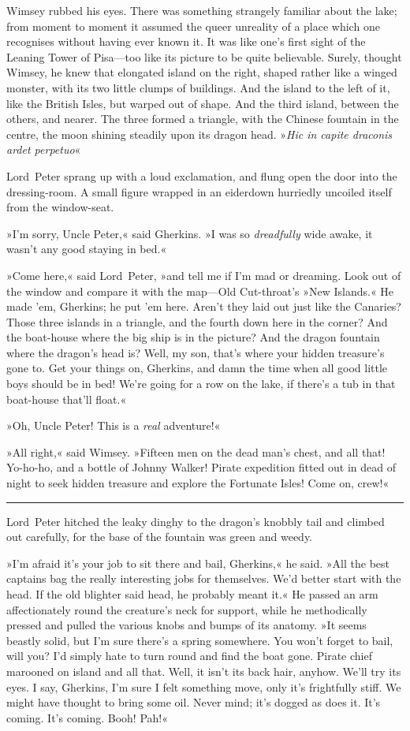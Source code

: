 Wimsey rubbed his eyes. There was something strangely familiar about the lake; from moment to moment it assumed the queer unreality of a place which one recognises without having ever known it. It was like one's first sight of the Leaning Tower of Pisa—too like its picture to be quite believable. Surely, thought Wimsey, he knew that elongated island on the right, shaped rather like a winged monster, with its two little clumps of buildings. And the island to the left of it, like the British Isles, but warped out of shape. And the third island, between the others, and nearer. The three formed a triangle, with the Chinese fountain in the centre, the moon shining steadily upon its dragon head. »\textit{Hic in capite draconis ardet perpetuo}\longdash«

Lord~Peter sprang up with a loud exclamation, and flung open the door into the dressing-room. A small figure wrapped in an eiderdown hurriedly uncoiled itself from the window-seat.

»I'm sorry, Uncle Peter,« said Gherkins. »I was so \textit{dreadfully} wide awake, it wasn't any good staying in bed.«

»Come here,« said Lord~Peter, »and tell me if I'm mad or dreaming. Look out of the window and compare it with the map—Old Cut-throat's »New Islands.« He made 'em, Gherkins; he put 'em here. Aren't they laid out just like the Canaries? Those three islands in a triangle, and the fourth down here in the corner? And the boat-house where the big ship is in the picture? And the dragon fountain where the dragon's head is? Well, my son, that's where your hidden treasure's gone to. Get your things on, Gherkins, and damn the time when all good little boys should be in bed! We're going for a row on the lake, if there's a tub in that boat-house that'll float.«

»Oh, Uncle Peter! This is a \textit{real} adventure!«

»All right,« said Wimsey. »Fifteen men on the dead man's chest, and all that! Yo-ho-ho, and a bottle of Johnny Walker! Pirate expedition fitted out in dead of night to seek hidden treasure and explore the Fortunate Isles! Come on, crew!«

\noindent\hfil\rule{0.5\textwidth}{.4pt}\hfil 

Lord~Peter hitched the leaky dinghy to the dragon's knobbly tail and climbed out carefully, for the base of the fountain was green and weedy.

»I'm afraid it's your job to sit there and bail, Gherkins,« he said. »All the best captains bag the really interesting jobs for themselves. We'd better start with the head. If the old blighter said head, he probably meant it.« He passed an arm affectionately round the creature's neck for support, while he methodically pressed and pulled the various knobs and bumps of its anatomy. »It seems beastly solid, but I'm sure there's a spring somewhere. You won't forget to bail, will you? I'd simply hate to turn round and find the boat gone. Pirate chief marooned on island and all that. Well, it isn't its back hair, anyhow. We'll try its eyes. I say, Gherkins, I'm sure I felt something move, only it's frightfully stiff. We might have thought to bring some oil. Never mind; it's dogged as does it. It's coming. It's coming. Booh! Pah!«


